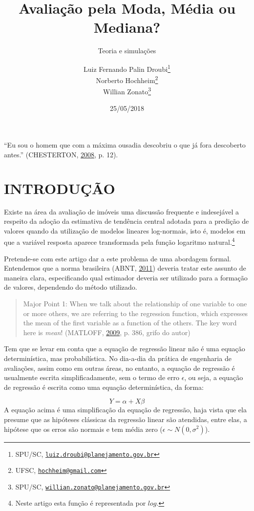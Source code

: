 \documentclass[a4paper]{article}
\title{Avaliação pela Moda, Média ou Mediana?}
\subtitle{Teoria e simulações}
\author{Luiz Fernando Palin Droubi\footnote{SPU/SC,
  \href{mailto:luiz.droubi@planejamento.gov.br}{\nolinkurl{luiz.droubi@planejamento.gov.br}}} \\ Norberto Hochheim\footnote{UFSC,
  \href{mailto:hochheim@gmail.com}{\nolinkurl{hochheim@gmail.com}}} \\ Willian Zonato\footnote{SPU/SC,
  \href{mailto:willian.zonato@planejamento.gov.br}{\nolinkurl{willian.zonato@planejamento.gov.br}}}}
\date{25/05/2018}
\let\rmarkdownfootnote\footnote%
\def\footnote{\protect\rmarkdownfootnote}
\begin{document}
\maketitle

``Eu sou o homem que com a máxima ousadia descobriu o que já fora
descoberto antes.'' (CHESTERTON,
\protect\hyperlink{ref-gkchesterton}{2008}, p. 12).

\section{INTRODUÇÃO}\label{introducao}

Existe na área da avaliação de imóveis uma discussão frequente e
indesejável a respeito da adoção da estimativa de tendência central
adotada para a predição de valores quando da utilização de modelos
lineares log-normais, isto é, modelos em que a variável resposta aparece
transformada pela função logaritmo natural.\footnote{Neste artigo esta
  função é representada por \(log\).}

Pretende-se com este artigo dar a este problema de uma abordagem formal.
Entendemos que a norma brasileira (ABNT,
\protect\hyperlink{ref-NBR1465302}{2011}) deveria tratar este assunto de
maneira clara, especificando qual estimador deveria ser utilizado para a
formação de valores, dependendo do método utilizado.

\begin{quote}
Major Point 1: When we talk about the relationship of one variable to
one or more others, we are referring to the regression function, which
expresses the mean of the first variable as a function of the others.
The key word here is \emph{mean}! (MATLOFF,
\protect\hyperlink{ref-matloff2009}{2009}, p. 386, grifo do autor)
\end{quote}

Tem que se levar em conta que a equação de regressão linear não é uma
equação determinística, mas probabilística. No dia-a-dia da prática de
engenharia de avaliações, assim como em outras áreas, no entanto, a
equação de regressão é usualmente escrita simplificadamente, sem o termo
de erro \(\epsilon\), ou seja, a equação de regressão é escrita como uma
equação determinística, da forma:

\[Y = \alpha + X\beta\] A equação acima é uma simplificação da equação
de regressão, haja vista que ela presume que as hipóteses clássicas da
regressão linear são atendidas, entre elas, a hipótese que os erros são
normais e tem média zero (\(\epsilon \sim N(0, \sigma^2)\)).
\end{document}

